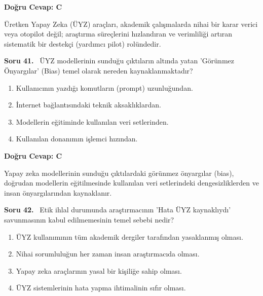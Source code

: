 \documentclass[11pt,a4paper,openany]{book}
\begin{document}
\vspace{4pt}
\begin{tcolorbox}[title=Cevap ve Açıklama, colback=gray!3!white, colframe=primarycolor!90!black, arc=2mm, fonttitle=\bfseries\sffamily, top=6pt, bottom=6pt]
    \textbf{Doğru Cevap: C}

    \vspace{2pt}
    Üretken Yapay Zeka (ÜYZ) araçları, akademik çalışmalarda nihai bir karar verici veya otopilot değil; araştırma süreçlerini hızlandıran ve verimliliği artıran sistematik bir destekçi (yardımcı pilot) rolündedir.
\end{tcolorbox}
\vspace{10pt}
\needspace{5cm}
\vspace{8pt}
\noindent\textbf{\large\sffamily Soru 41.} \ ÜYZ modellerinin sunduğu çıktıların altında yatan 'Görünmez Önyargılar' (Bias) temel olarak nereden kaynaklanmaktadır?

\begin{enumerate}[label=\Alph*), leftmargin=25pt, topsep=4pt, itemsep=2pt]
        \item Kullanıcının yazdığı komutların (prompt) uzunluğundan.
        \item İnternet bağlantısındaki teknik aksaklıklardan.
        \item Modellerin eğitiminde kullanılan veri setlerinden.
        \item Kullanılan donanımın işlemci hızından.
\end{enumerate}

\vspace{4pt}
\begin{tcolorbox}[title=Cevap ve Açıklama, colback=gray!3!white, colframe=primarycolor!90!black, arc=2mm, fonttitle=\bfseries\sffamily, top=6pt, bottom=6pt]
    \textbf{Doğru Cevap: C}

    \vspace{2pt}
    Yapay zeka modellerinin sunduğu çıktılardaki görünmez önyargılar (bias), doğrudan modellerin eğitilmesinde kullanılan veri setlerindeki dengesizliklerden ve insan önyargılarından kaynaklanır.
\end{tcolorbox}
\vspace{10pt}
\needspace{5cm}
\vspace{8pt}
\noindent\textbf{\large\sffamily Soru 42.} \ Etik ihlal durumunda araştırmacının 'Hata ÜYZ kaynaklıydı' savunmasının kabul edilmemesinin temel sebebi nedir?

\begin{enumerate}[label=\Alph*), leftmargin=25pt, topsep=4pt, itemsep=2pt]
        \item ÜYZ kullanımının tüm akademik dergiler tarafından yasaklanmış olması.
        \item Nihai sorumluluğun her zaman insan araştırmacıda olması.
        \item Yapay zeka araçlarının yasal bir kişiliğe sahip olması.
        \item ÜYZ sistemlerinin hata yapma ihtimalinin sıfır olması.
\end{enumerate}
\end{document}
